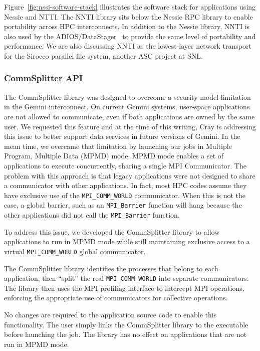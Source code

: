 Figure~\ref{fig:nssi-software-stack} illustrates the software stack for applications 
using Nessie and NTTI. The NNTI library sits below the Nessie RPC library to
enable portability across HPC interconnects.  In addition to the Nessie
library, NNTI is also used by the
ADIOS/DataStager~\cite{abbasi:2010:datastager} to provide the same level of
portability and performance.  We are also discussing NNTI as the lowest-layer
network transport for the Sirocco parallel file system, another ASC project at
SNL.

\subsubsection{CommSplitter API}

The CommSplitter library was designed to overcome a security model limitation in
the Gemini interconnect.  On current Gemini systems, user-space applications
are not allowed to communicate, even if both applications are owned by the same
user.  We requested this feature and at the time of this writing, Cray is
addressing this issue to better support data services in future versions of
Gemini.  In the mean time, we overcame that limitation by launching our jobs in
Multiple Program, Multiple Data (MPMD) mode.  MPMD mode enables a set of
applications to execute concurrently, sharing a single MPI Communicator.   The
problem with this approach is that legacy applications were not designed to
share a communicator with other applications.  In fact, most HPC codes assume
they have exclusive use of the \texttt{MPI\_COMM\_WORLD} communicator.  When
this is not the case, a global barrier, such as an \texttt{MPI\_Barrier}
function will hang because the other applications did not call the
\texttt{MPI\_Barrier} function. 

To address this issue, we developed the CommSplitter library to allow
applications to run in MPMD mode while still maintaining exclusive access to a 
virtual \texttt{MPI\_COMM\_WORLD} global communicator.  

The CommSplitter library identifies the processes that belong to each
application, then ``split'' the real \texttt{MPI\_COMM\_WORLD} into separate
communicators.   The library then uses the MPI profiling interface to intercept
MPI operations, enforcing the appropriate use of communicators for
collective operations.

No changes are required to the application source code to enable this
functionality.  The user simply links the CommSplitter library to the executable
before launching the job.  The library has no effect on applications that are
not run in MPMD mode. 



